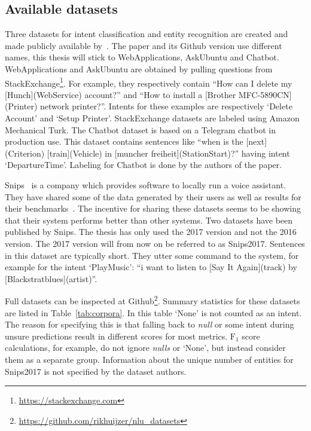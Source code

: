 \subsection{Available datasets}
\label{subsec:available_datasets}
Three datasets for intent classification and entity recognition are created and made publicly available by~\citet{braun2017}.
The paper and its Github version use different names, this thesis will stick to WebApplications, AskUbuntu and Chatbot.
WebApplications and AskUbuntu are obtained by pulling questions from StackExchange\footnote{\url{https://stackexchange.com}}.
For example, they respectively contain ``How can I delete my [Hunch](WebService) account?'' and ``How to install a [Brother MFC-5890CN](Printer) network printer?''.
Intents for these examples are respectively `Delete Account' and `Setup Printer'.
StackExchange datasets are labeled using Amazon Mechanical Turk.
The Chatbot dataset is based on a Telegram chatbot in production use.
This dataset contains sentences like ``when is the [next](Criterion) [train](Vehicle) in [muncher freiheit](StationStart)?'' having intent `DepartureTime'.
Labeling for Chatbot is done by the authors of the paper.

Snips~\citep{snips2019voice} is a company which provides software to locally run a voice assistant.
They have shared some of the data generated by their users as well as results for their benchmarks~\citep{snips2017dataset}.
The incentive for sharing these datasets seems to be showing that their system performs better than other systems.
Two datasets have been published by Snips.
The thesis has only used the 2017 version and not the 2016 version.
The 2017 version will from now on be referred to as Snips2017.
Sentences in this dataset are typically short.
They utter some command to the system, for example for the intent `PlayMusic': ``i want to listen to [Say It Again](track) by [Blackstratblues](artist)''.

Full datasets can be inspected at Github\footnote{\url{https://github.com/rikhuijzer/nlu\_datasets}}.
Summary statistics for these datasets are listed in Table~\ref{tab:corpora}.
In this table `None' is not counted as an intent.
The reason for specifying this is that falling back to \textit{null} or some intent during unsure predictions result in different scores for most metrics.
$\text{F}_1$ score calculations, for example, do not ignore \textit{nulls} or `None', but instead consider them as a separate group.
Information about the unique number of entities for Snips2017 is not specified by the dataset authors.

